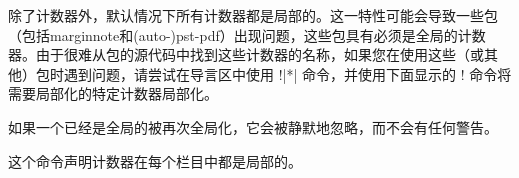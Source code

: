 % 
% 
除了计数器外，默认情况下所有计数器都是局部的。这一特性可能会导致一些包（包括\textsf{marginnote}和\textsf{(auto-)pst-pdf}）出现问题，这些包具有必须是全局的计数器。由于很难从包的源代码中找到这些计数器的名称，如果您在使用这些（或其他）包时遇到问题，请尝试在导言区中使用 \!\globalcounter!|*| 命令，并使用下面显示的 \!\localcounter! 命令将需要局部化的特定计数器局部化。

如果一个已经是全局的被再次全局化，它会被静默地忽略，而不会有任何警告。
% 
% 
% 

这个命令声明计数器在每个栏目中都是局部的。

% 

